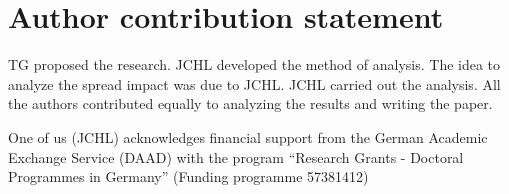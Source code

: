\section{Author contribution statement}

TG proposed the research. JCHL developed the method of analysis. The idea to
analyze the spread impact was due to JCHL. JCHL carried out the analysis. All
the authors contributed equally to analyzing the results and writing the paper.

\begin{acknowledgement}
    One of us (JCHL) acknowledges financial support from the German Academic
    Exchange Service (DAAD) with the program ``Research Grants - Doctoral
    Programmes in Germany'' (Funding programme 57381412)
\end{acknowledgement}
